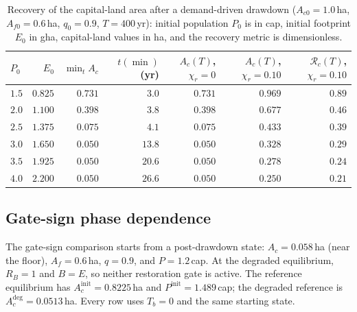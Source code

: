 \documentclass[11pt,a4paper]{article}
\begin{document}
\begin{table}[htbp]
\centering\small
\caption{Recovery of the capital-land area after a demand-driven drawdown ($A_{c0}=1.0$\,ha, $A_{f0}=0.6$\,ha, $q_0=0.9$, $T=400$\,yr): initial population $P_0$ is in cap, initial footprint $E_0$ in gha, capital-land values in ha, and the recovery metric is dimensionless.}
\label{tab:si_recovery}
\begin{tabular}{l r r r r r r}
\toprule
$P_0$ & $E_0$ & $\min_tA_c$ & $t(\min)$ (yr) & $A_c(T)$, $\chi_r=0$ & $A_c(T)$, $\chi_r=0.10$ & $\mathcal R_c(T)$, $\chi_r=0.10$ \\
\midrule
$1.5$ & $0.825$ & $0.731$ & $3.0$ & $0.731$ & $0.969$ & $0.89$ \\
$2.0$ & $1.100$ & $0.398$ & $3.8$ & $0.398$ & $0.677$ & $0.46$ \\
$2.5$ & $1.375$ & $0.075$ & $4.1$ & $0.075$ & $0.433$ & $0.39$ \\
$3.0$ & $1.650$ & $0.050$ & $13.8$ & $0.050$ & $0.328$ & $0.29$ \\
$3.5$ & $1.925$ & $0.050$ & $20.6$ & $0.050$ & $0.278$ & $0.24$ \\
$4.0$ & $2.200$ & $0.050$ & $26.6$ & $0.050$ & $0.250$ & $0.21$ \\
\bottomrule
\end{tabular}
\end{table}

\subsection{Gate-sign phase dependence}\label{si:gates}

The gate-sign comparison starts from a post-drawdown state: $A_c=0.058$\,ha (near the floor), $A_f=0.6$\,ha, $q=0.9$, and $P=1.2$\,cap. At the degraded equilibrium, $R_B=1$ and $B=E$, so neither restoration gate is active. The reference equilibrium has $A_c^{\mathrm{init}}=0.8225$\,ha and $P^{\mathrm{init}}=1.489$\,cap; the degraded reference is $A_c^{\mathrm{deg}}=0.0513$\,ha. Every row uses $T_b=0$ and the same starting state.
\end{document}
